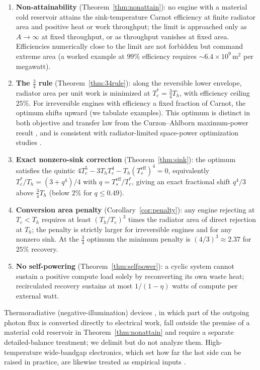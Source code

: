 \documentclass[11pt]{article}
\theoremstyle{definition}
\theoremstyle{remark}
\newcommand{\Th}{T_h}
\newcommand{\Tc}{T_c}
\newcommand{\Ts}{T_s^{\mathrm{eff}}}
\begin{document}
\begin{enumerate}
  \item \textbf{Non-attainability} (Theorem~\ref{thm:nonattain}): no engine with a material cold reservoir attains the sink-temperature Carnot efficiency at finite radiator area and positive heat or work throughput; the limit is approached only as $A\to\infty$ at fixed throughput, or as throughput vanishes at fixed area. Efficiencies numerically close to the limit are not forbidden but command extreme area (a worked example at $99\%$ efficiency requires ${\sim}6.4\times10^{9}\,\mathrm{m^{2}}$ per megawatt).
  \item \textbf{The $\tfrac{3}{4}$ rule} (Theorem~\ref{thm:34rule}): along the reversible lower envelope, radiator area per unit work is minimized at $\Tc^{*}=\tfrac{3}{4}\Th$, with efficiency ceiling $25\%$. For irreversible engines with efficiency a fixed fraction of Carnot, the optimum shifts upward (we tabulate examples). This optimum is distinct in both objective and transfer law from the Curzon--Ahlborn maximum-power result \cite{curzon1975}, and is consistent with radiator-limited space-power optimization studies \cite{nasa1989,energyreports2022}.
  \item \textbf{Exact nonzero-sink correction} (Theorem~\ref{thm:sink}): the optimum satisfies the quintic $4\Tc^{5}-3\Th \Tc^{4}-\Th (\Ts)^{4}=0$, equivalently $\Tc^{*}/\Th=(3+q^{4})/4$ with $q=\Ts/\Tc^{*}$, giving an exact fractional shift $q^{4}/3$ above $\tfrac{3}{4}\Th$ (below $2\%$ for $q\le0.49$).
  \item \textbf{Conversion area penalty} (Corollary~\ref{cor:penalty}): any engine rejecting at $\Tc<\Th$ requires at least $(\Th/\Tc)^{3}$ times the radiator area of direct rejection at $\Th$; the penalty is strictly larger for irreversible engines and for any nonzero sink. At the $\tfrac{3}{4}$ optimum the minimum penalty is $(4/3)^{3}\approx2.37$ for $25\%$ recovery.
  \item \textbf{No self-powering} (Theorem~\ref{thm:selfpower}): a cyclic system cannot sustain a positive compute load solely by reconverting its own waste heat; recirculated recovery sustains at most $1/(1-\eta)$ watts of compute per external watt.
\end{enumerate}

Thermoradiative (negative-illumination) devices \cite{strandberg2011,santhanam2016}, in which part of the outgoing photon flux is converted directly to electrical work, fall outside the premise of a material cold reservoir in Theorem~\ref{thm:nonattain} and require a separate detailed-balance treatment; we delimit but do not analyze them. High-temperature wide-bandgap electronics, which set how far the hot side can be raised in practice, are likewise treated as empirical inputs \cite{gesic,uiucgan}.
\end{document}
